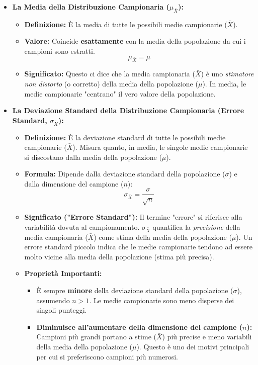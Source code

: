 \documentclass[12pt, a4paper]{article}
\newcommand{\popmean}{\mu} %
\newcommand{\samplemean}{\bar{X}} %
\newcommand{\popsd}{\sigma} %
\newcommand{\stderr}{\sigma_{\samplemean}} %
\begin{document}
\begin{itemize}
    \item \textbf{La Media della Distribuzione Campionaria ($\mu_{\samplemean}$):}
        \begin{itemize}
            \item \textbf{Definizione:} È la media di tutte le possibili medie campionarie ($\samplemean$).
            \item \textbf{Valore:} Coincide \textbf{esattamente} con la media della popolazione da cui i campioni sono estratti.
                \begin{equation*}
                    \mu_{\samplemean} = \popmean
                \end{equation*}
            \item \textbf{Significato:} Questo ci dice che la media campionaria ($\samplemean$) è uno \textit{stimatore non distorto} (o corretto) della media della popolazione ($\popmean$). In media, le medie campionarie "centrano" il vero valore della popolazione.
        \end{itemize}

    \item \textbf{La Deviazione Standard della Distribuzione Campionaria (Errore Standard, $\stderr$):}
        \begin{itemize}
            \item \textbf{Definizione:} È la deviazione standard di tutte le possibili medie campionarie ($\samplemean$). Misura quanto, in media, le singole medie campionarie si discostano dalla media della popolazione ($\popmean$).
            \item \textbf{Formula:} Dipende dalla deviazione standard della popolazione ($\popsd$) e dalla dimensione del campione ($n$):
                \begin{equation*}
                    \stderr = \frac{\popsd}{\sqrt{n}}
                \end{equation*}
            \item \textbf{Significato ("Errore Standard"):} Il termine "errore" si riferisce alla variabilità dovuta al campionamento. $\stderr$ quantifica la \textit{precisione} della media campionaria ($\samplemean$) come stima della media della popolazione ($\popmean$). Un errore standard piccolo indica che le medie campionarie tendono ad essere molto vicine alla media della popolazione (stima più precisa).
            \item \textbf{Proprietà Importanti:}
                \begin{itemize}
                    \item È sempre \textbf{minore} della deviazione standard della popolazione ($\popsd$), assumendo $n>1$. Le medie campionarie sono meno disperse dei singoli punteggi.
                    \item \textbf{Diminuisce all'aumentare della dimensione del campione ($n$):} Campioni più grandi portano a stime ($\samplemean$) più precise e meno variabili della media della popolazione ($\popmean$). Questo è uno dei motivi principali per cui si preferiscono campioni più numerosi.
                \end{itemize}
        \end{itemize}


\end{itemize}
\end{document}
